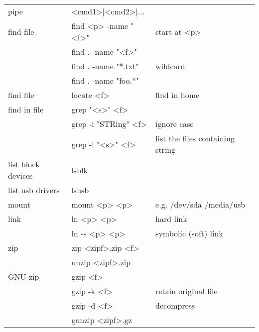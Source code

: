 {\begin{tabularx}{\linewidth}{@{} l>{\ttfamily}lX @{}}
    pipe               & <cmd1>|<cmd2>|...          &                                  \\
    find file          & find <p> -name "<f>"       & start at <p>                     \\
                       & find . -name "<f>"         &                                  \\
                       & find . -name "*.txt"       & wildcard                         \\
                       & find . -name "foo.*"       &                                  \\
    find file          & locate <f>                 & find in home                     \\
    find in file       & grep "<s>" <f>             &                                  \\
                       & grep -i "STRing" <f>       & ignore case                      \\
                       & grep -l "<s>" <f>          & list the files containing string \\
    list block devices & lsblk                      &                                  \\
    list usb drivers   & lsusb                      &                                  \\
    mount              & mount <p> <p>              & e.g. /dev/sda /media/usb         \\
    link               & ln <p> <p>                 & hard link                        \\
                       & ln -s <p> <p>              & symbolic (soft) link             \\
    zip                & zip <zipf>.zip <f>         &                                  \\
                       & unzip <zipf>.zip           &                                  \\
    GNU zip            & gzip <f>                   &                                  \\
                       & gzip -k <f>                & retain original file             \\
                       & gzip -d <f>                & decompress                       \\
                       & gunzip <zipf>.gz           &                                  \\

\end{tabularx}}
